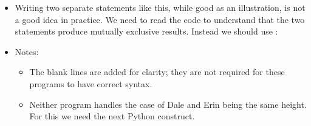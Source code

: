 \documentclass[letterpaper,10pt,english]{sphinxmanual}
\begin{document}
\begin{itemize}
\item {} 
Writing two separate  statements like this, while good as an
illustration, is not a good idea in practice.  We need to read the
code to understand that the two  statements produce mutually
exclusive results.  Instead we should use :

\begin{sphinxVerbatim}[commandchars=\\\{\}]
  
      

  
      

   
     
      
     
      

 
\end{sphinxVerbatim}

\item {} 
Notes:
\begin{itemize}
\item {} 
The blank lines are added for clarity; they are not required
for these programs to have correct syntax.

\item {} 
Neither program handles the case of Dale and Erin being the same
height. For this we need the next Python construct.

\end{itemize}

\end{itemize}
\end{document}

